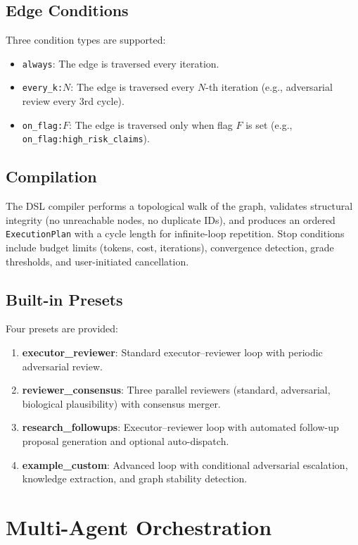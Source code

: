\documentclass[10pt]{article}
\begin{document}
\subsection{Edge Conditions}
Three condition types are supported:
\begin{itemize}
  \item \texttt{always}: The edge is traversed every iteration.
  \item \texttt{every\_k:$N$}: The edge is traversed every $N$-th iteration (e.g., adversarial review every 3rd cycle).
  \item \texttt{on\_flag:$F$}: The edge is traversed only when flag $F$ is set (e.g., \texttt{on\_flag:high\_risk\_claims}).
\end{itemize}

\subsection{Compilation}
The DSL compiler performs a topological walk of the graph, validates structural integrity (no unreachable nodes, no duplicate IDs), and produces an ordered \texttt{ExecutionPlan} with a cycle length for infinite-loop repetition. Stop conditions include budget limits (tokens, cost, iterations), convergence detection, grade thresholds, and user-initiated cancellation.

\subsection{Built-in Presets}
Four presets are provided:
\begin{enumerate}
  \item \textbf{executor\_reviewer}: Standard executor--reviewer loop with periodic adversarial review.
  \item \textbf{reviewer\_consensus}: Three parallel reviewers (standard, adversarial, biological plausibility) with consensus merger.
  \item \textbf{research\_followups}: Executor--reviewer loop with automated follow-up proposal generation and optional auto-dispatch.
  \item \textbf{example\_custom}: Advanced loop with conditional adversarial escalation, knowledge extraction, and graph stability detection.
\end{enumerate}


\section{Multi-Agent Orchestration}
\label{sec:orchestration}
\end{document}
